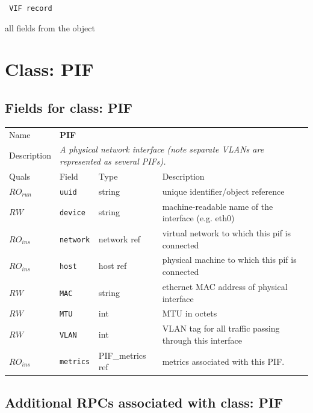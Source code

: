 \vspace{0.3cm}

{\tt 
VIF record
}


all fields from the object
\vspace{0.3cm}
\vspace{0.3cm}
\vspace{0.3cm}

\vspace{1cm}
\newpage
\section{Class: PIF}
\subsection{Fields for class: PIF}
\begin{longtable}{|lllp{}|}
\hline
\multicolumn{1}{|l}{Name} & \multicolumn{3}{l|}{\bf PIF} \\
\multicolumn{1}{|l}{Description} & \multicolumn{3}{l|}{\parbox{11cm}{\em A
physical network interface (note separate VLANs are represented as several
PIFs).}} \\
\hline
Quals & Field & Type & Description \\
\hline
$\mathit{RO}_\mathit{run}$ &  {\tt uuid} & string & unique identifier/object reference \\
$\mathit{RW}$ &  {\tt device} & string & machine-readable name of the interface (e.g. eth0) \\
$\mathit{RO}_\mathit{ins}$ &  {\tt network} & network ref & virtual network to which this pif is connected \\
$\mathit{RO}_\mathit{ins}$ &  {\tt host} & host ref & physical machine to which this pif is connected \\
$\mathit{RW}$ &  {\tt MAC} & string & ethernet MAC address of physical interface \\
$\mathit{RW}$ &  {\tt MTU} & int & MTU in octets \\
$\mathit{RW}$ &  {\tt VLAN} & int & VLAN tag for all traffic passing through this interface \\
$\mathit{RO}_\mathit{ins}$ &  {\tt metrics} & PIF\_metrics ref & metrics associated with this PIF. \\
\hline
\end{longtable}
\subsection{Additional RPCs associated with class: PIF}
